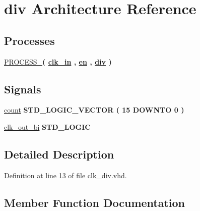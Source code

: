 \hypertarget{classclk__div_1_1div}{}\section{div Architecture Reference}
\label{classclk__div_1_1div}
\subsection*{Processes}
 \begin{DoxyCompactItemize}
\item 
\hyperlink{classclk__div_1_1div_a0a2b446597a947bf6a5807498fa17ba1}{P\+R\+O\+C\+E\+S\+S\+\_}{\bfseries  ( {\bfseries {\bfseries \hyperlink{classclk__div_a57fad7f33f7766724bdea76e7b0330ef}{clk\+\_\+in}} \textcolor{vhdlchar}{ }} , {\bfseries {\bfseries \hyperlink{classclk__div_a512588aa484615b7e90600a1bc9507b4}{en}} \textcolor{vhdlchar}{ }} , {\bfseries {\bfseries \hyperlink{classclk__div_a425c2042b3ea21827b9b29c6712312d9}{div}} \textcolor{vhdlchar}{ }} )}
\end{DoxyCompactItemize}
\subsection*{Signals}
 \begin{DoxyCompactItemize}
\item 
\hyperlink{classclk__div_1_1div_a25d9525383f1b60f7c2e081319516a96}{count} {\bfseries \textcolor{comment}{S\+T\+D\+\_\+\+L\+O\+G\+I\+C\+\_\+\+V\+E\+C\+T\+O\+R}\textcolor{vhdlchar}{ }\textcolor{vhdlchar}{(}\textcolor{vhdlchar}{ }\textcolor{vhdlchar}{ } \textcolor{vhdldigit}{15} \textcolor{vhdlchar}{ }\textcolor{keywordflow}{D\+O\+W\+N\+T\+O}\textcolor{vhdlchar}{ }\textcolor{vhdlchar}{ } \textcolor{vhdldigit}{0} \textcolor{vhdlchar}{ }\textcolor{vhdlchar}{)}\textcolor{vhdlchar}{ }} 
\item 
\hyperlink{classclk__div_1_1div_a91ef6072d99aa4429fb1b3a883554754}{clk\+\_\+out\+\_\+bi} {\bfseries \textcolor{comment}{S\+T\+D\+\_\+\+L\+O\+G\+I\+C}\textcolor{vhdlchar}{ }} 
\end{DoxyCompactItemize}


\subsection{Detailed Description}


Definition at line 13 of file clk\+\_\+div.\+vhd.



\subsection{Member Function Documentation}
\hypertarget{classclk__div_1_1div_a0a2b446597a947bf6a5807498fa17ba1}{}
